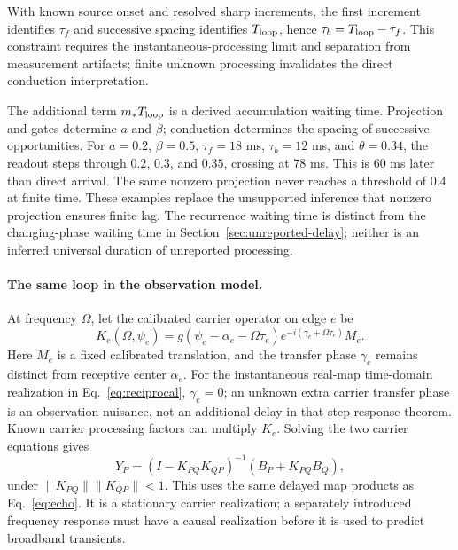 With known source onset and resolved sharp increments, the first increment identifies $\tau_f$ and successive spacing identifies $T_{\rm loop}$, hence $\tau_b=T_{\rm loop}-\tau_f$. This constraint requires the instantaneous-processing limit and separation from measurement artifacts; finite unknown processing invalidates the direct conduction interpretation.

The additional term $m_*T_{\rm loop}$ is a derived accumulation waiting time. Projection and gates determine $a$ and $\beta$; conduction determines the spacing of successive opportunities. For $a=0.2$, $\beta=0.5$, $\tau_f=18$ ms, $\tau_b=12$ ms, and $\theta=0.34$, the readout steps through $0.2$, $0.3$, and $0.35$, crossing at 78 ms. This is 60 ms later than direct arrival. The same nonzero projection never reaches a threshold of $0.4$ at finite time. These examples replace the unsupported inference that nonzero projection ensures finite lag. The recurrence waiting time is distinct from the changing-phase waiting time in Section~\ref{sec:unreported-delay}; neither is an inferred universal duration of unreported processing.




\paragraph{The same loop in the observation model.} At frequency $\Omega$, let the calibrated carrier operator on edge $e$ be
\[
K_e(\Omega,\psi_e)=g(\psi_e-\alpha_e-\Omega\tau_e)
e^{-i(\gamma_e+\Omega\tau_e)}M_e.
\]
Here $M_e$ is a fixed calibrated translation, and the transfer phase $\gamma_e$ remains distinct from receptive center $\alpha_e$. For the instantaneous real-map time-domain realization in Eq.~\eqref{eq:reciprocal}, $\gamma_e=0$; an unknown extra carrier transfer phase is an observation nuisance, not an additional delay in that step-response theorem. Known carrier processing factors can multiply $K_e$. Solving the two carrier equations gives
\begin{equation}
Y_P=(I-K_{PQ}K_{QP})^{-1}(B_P+K_{PQ}B_Q),\label{eq:loop-carrier}
\end{equation}
under $\|K_{PQ}\|\|K_{QP}\|<1$. This uses the same delayed map products as Eq.~\eqref{eq:echo}. It is a stationary carrier realization; a separately introduced frequency response must have a causal realization before it is used to predict broadband transients.

